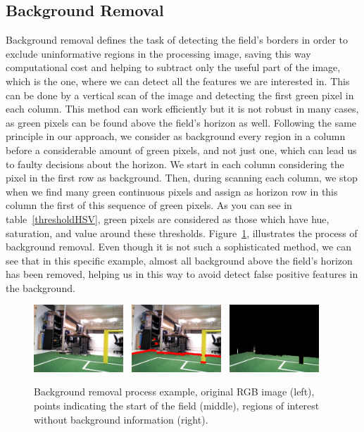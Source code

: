 \documentclass[	DIV=calc,%
							paper=a4,%
							fontsize=9pt,%
							twocolumn]{scrartcl}	 					%
\begin{document}
\subsection{Background Removal}
Background removal defines the task of detecting the field's borders in order to exclude uninformative regions in the processing image, saving this way computational cost and helping to subtract only the useful part of the image, which is the one, where we can detect all the features we are interested in. This can be done by a vertical scan of the image and detecting the first green pixel in each column. This method can work efficiently but it is not robust in many cases, as green pixels can be found above the field's horizon as well. Following the same principle in our approach, we consider as background every region in a column before a considerable amount of green pixels, and not just one, which can lead us to faulty decisions about the horizon. We start in each column considering the pixel in the first row as background. Then, during scanning each column, we stop when we find many green continuous pixels and assign as horizon row in this column the first of this sequence of green pixels.  As you can see in table~\ref{thresholdHSV}, green pixels are considered as those which have hue, saturation, and value around these thresholds. Figure~\ref{background}, illustrates the process of background removal. Even though it is not such a sophisticated method, we can see that in this specific example, almost all background above the field's horizon has been removed, helping us in this way to avoid detect false positive features in the background.

\begin{figure}[t!]
\caption{Background removal process example, original RGB image (left), points indicating the start of the field (middle), regions of interest without background information (right).}
\label{background}
\centering    
\includegraphics[width=0.3\textwidth]{figures/original.png} \	
\includegraphics[width=0.3\textwidth]{figures/back.png} \	
\includegraphics[width=0.3\textwidth]{figures/back_fixed.png}	
\end{figure}
\end{document}
